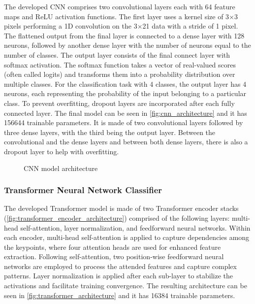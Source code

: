 The developed CNN comprises two convolutional layers each with 64 feature maps and ReLU activation functions. 
The first layer uses a kernel size of 3$\times$3 pixels performing a 1D convolution on the 3$\times$21 data with a stride of 1 pixel. The flattened output from the final layer is connected to a dense layer with 128 neurons, followed by another dense layer with the number of neurons equal to the number of classes. The output layer consists of the final connect layer with softmax activation. The softmax function takes a vector of real-valued scores (often called logits) and transforms them into a probability distribution over multiple classes. For the classification task with 4 classes, the output layer has 4 neurons, each representing the probability of the input belonging to a particular class. To prevent overfitting, dropout layers are incorporated after each fully connected layer. The final model can be seen in \autoref{fig:cnn_architecture} and it has \num{156644} trainable parameters. It is made of two convolutional layers followed by three dense layers, with the third being the output layer. Between the convolutional and the dense layers and between both dense layers, there is also a dropout layer to help with overfitting.

\begin{figure}[ht]
    \centering
    {\fontsize{9}{11}\selectfont}
    \caption{CNN model architecture}
    \label{fig:cnn_architecture}
\end{figure}

\subsubsection{Transformer Neural Network Classifier}
\label{subsubsection:transformer_classifier}

The developed Transformer model is made of two Transformer encoder stacks (\autoref{fig:transformer_encoder_architecture}) comprised of the following layers: multi-head self-attention, layer normalization, and feedforward neural networks. Within each encoder, multi-head self-attention is applied to capture dependencies among the keypoints, where four attention heads are used for enhanced feature extraction. Following self-attention, two position-wise feedforward neural networks are employed to process the attended features and capture complex patterns. Layer normalization is applied after each sub-layer to stabilize the activations and facilitate training convergence. The resulting architecture can be seen in \autoref{fig:transformer_architecture} and it has \num{16384} trainable parameters.

